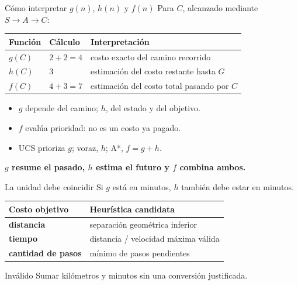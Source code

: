 \documentclass[aspectratio=169,11pt]{beamer}
\newcommand{\concepto}[1]{\textcolor{UAPTeal}{\textbf{#1}}}
\begin{document}
\begin{frame}{Cómo interpretar $g(n)$, $h(n)$ y $f(n)$}
  \small
  Para $C$, alcanzado mediante $S\rightarrow A\rightarrow C$:
  \begin{table}
  \begin{tabularx}{\textwidth}{>{\bfseries}p{}p{}X}
    \toprule
    Función & Cálculo & Interpretación \\\midrule
    $g(C)$ & $2+2=4$ & costo exacto del camino recorrido \\
    $h(C)$ & $3$ & estimación del costo restante hasta $G$ \\
    $f(C)$ & $4+3=7$ & estimación del costo total pasando por $C$ \\
    \bottomrule
  \end{tabularx}
  \end{table}
  \begin{itemize}
    \item $g$ depende del camino; $h$, del estado y del objetivo.
    \item $f$ evalúa prioridad: no es un costo ya pagado.
    \item UCS prioriza $g$; voraz, $h$; A*, $f=g+h$.
  \end{itemize}
  \centering\concepto{$g$ resume el pasado, $h$ estima el futuro y $f$ combina ambos.}
\end{frame}

\begin{frame}{La unidad debe coincidir}
  Si $g$ está en minutos, $h$ también debe estar en minutos.
  \begin{table}
  \begin{tabularx}{.88\textwidth}{>{\bfseries}p{}X}
    \toprule
    Costo objetivo & Heurística candidata \\\midrule
    distancia & separación geométrica inferior \\
    tiempo & distancia / velocidad máxima válida \\
    cantidad de pasos & mínimo de pasos pendientes \\
    \bottomrule
  \end{tabularx}
  \end{table}
  \begin{alertblock}{Inválido}
    Sumar kilómetros y minutos sin una conversión justificada.
  \end{alertblock}
\end{frame}
\end{document}

